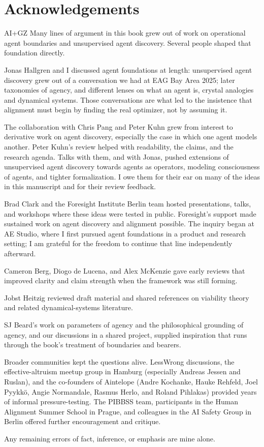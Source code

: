 \chapter*{Acknowledgements}

\begin{authbar}{AI+GZ}
Many lines of argument in this book grew out of work on operational agent boundaries and unsupervised agent discovery.
Several people shaped that foundation directly.

Jonas Hallgren and I discussed agent foundations at length: unsupervised agent discovery grew out of a conversation we had at EAG Bay Area 2025; 
later taxonomies of agency, and different lenses on what an agent is, crystal analogies and dynamical systems.
Those conversations are what led to the insistence that alignment must begin by finding the real optimizer, not by assuming it.

The collaboration with Chris Pang and Peter Kuhn grew from interest to derivative work on agent discovery, especially the case in which one agent models another.
Peter Kuhn's review helped with readability, the claims, and the research agenda.
Talks with them, and with Jonas, pushed extensions of unsupervised agent discovery towards agents as operators, modeling consciousness of agents, and tighter formalization.
I owe them for their ear on many of the ideas in this manuscript and for their review feedback.

Brad Clark and the Foresight Institute Berlin team hosted presentations, talks, and workshops where these ideas were tested in public.
Foresight's support made sustained work on agent discovery and alignment possible.
The inquiry began at AE Studio, where I first pursued agent foundations in a product and research setting; I am grateful for the freedom to continue that line independently afterward.

Cameron Berg, Diogo de Lucena, and Alex McKenzie gave early reviews that improved clarity and claim strength when the framework was still forming.

Jobst Heitzig reviewed draft material and shared references on viability theory and related dynamical-systems literature.

SJ Beard's work on parameters of agency and the philosophical grounding of agency, and our discussions in a shared project, supplied inspiration that runs through the book's treatment of boundaries and bearers.

Broader communities kept the questions alive.
LessWrong discussions, the effective-altruism meetup group in Hamburg (especially Andreas Jessen and Ruslan), and the co-founders of Aintelope (Andre Kochanke, Hauke Rehfeld, Joel Pyykkö, Angie Normandale, Rasmus Herlo, and Roland Pihlakas) provided years of informal pressure-testing.
The PIBBSS team, participants in the Human Alignment Summer School in Prague, and colleagues in the AI Safety Group in Berlin offered further encouragement and critique.

Any remaining errors of fact, inference, or emphasis are mine alone.
\end{authbar}
